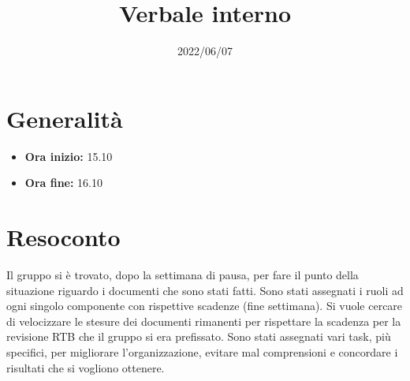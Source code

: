 \documentclass{classes/base}
\title{Verbale interno}
\date{2022/06/07}
\author{\angela}
\renewcommand{\maketitle}{
    
}
\begin{document}
    \maketitle

    \section*{Generalità}
    \begin{itemize}
        \item \textbf{Ora inizio:} 15.10
        \item \textbf{Ora fine:} 16.10
    \end{itemize}

    \section*{Resoconto}
    Il gruppo si è trovato, dopo la settimana di pausa, per fare il punto della situazione riguardo i documenti che sono stati fatti.
    Sono stati assegnati i ruoli ad ogni singolo componente con rispettive scadenze (fine settimana). 
    Si vuole cercare di velocizzare le stesure dei documenti rimanenti per rispettare la scadenza per la revisione RTB che il gruppo si era prefissato.
    Sono stati assegnati vari task, più specifici, per migliorare l'organizzazione, evitare mal comprensioni e concordare i risultati che si vogliono ottenere.
\end{document}
